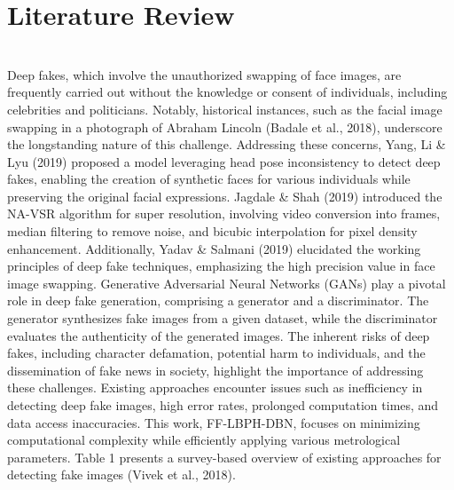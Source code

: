 \chapter{Literature Review}
\\
Deep fakes, which involve the unauthorized swapping of face images, are frequently carried out without the knowledge or consent of individuals, including celebrities and politicians. Notably, historical instances, such as the facial image swapping in a photograph of Abraham Lincoln (Badale et al., 2018), underscore the longstanding nature of this challenge. Addressing these concerns, Yang, Li \& Lyu (2019) proposed a model leveraging head pose inconsistency to detect deep fakes, enabling the creation of synthetic faces for various individuals while preserving the original facial expressions.
Jagdale \& Shah (2019) introduced the NA-VSR algorithm for super resolution, involving video conversion into frames, median filtering to remove noise, and bicubic interpolation for pixel density enhancement. Additionally, Yadav \& Salmani (2019) elucidated the working principles of deep fake techniques, emphasizing the high precision value in face image swapping.
Generative Adversarial Neural Networks (GANs) play a pivotal role in deep fake generation, comprising a generator and a discriminator. The generator synthesizes fake images from a given dataset, while the discriminator evaluates the authenticity of the generated images. The inherent risks of deep fakes, including character defamation, potential harm to individuals, and the dissemination of fake news in society, highlight the importance of addressing these challenges.
Existing approaches encounter issues such as inefficiency in detecting deep fake images, high error rates, prolonged computation times, and data access inaccuracies. This work, FF-LBPH-DBN, focuses on minimizing computational complexity while efficiently applying various metrological parameters. Table 1 presents a survey-based overview of existing approaches for detecting fake images (Vivek et al., 2018).

